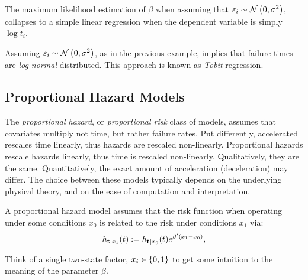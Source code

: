 \begin{example}
\label{eg:accelerated_gaussian}
The maximum likelihood estimation of $\beta$ when assuming that $\varepsilon_i \sim \mathcal{N}\left(0,\sigma^2\right)$, collapses to a simple linear regression when the dependent variable is simply $\log t_i$.
\end{example}


\begin{extra}
Assuming $\varepsilon_i \sim \mathcal{N}\left(0,\sigma^2\right)$, as in the previous example, implies that failure times are \emph{log normal} distributed. 
This approach is known as \emph{Tobit} regression.
\end{extra}







\subsection{Proportional Hazard Models}
The \emph{proportional hazard}, or \emph{proportional risk} class of models, assumes that covariates multiply not time, but rather failure rates. 
Put differently, accelerated rescales time linearly, thus hazards are rescaled non-linearly. Proportional hazards rescale hazards linearly, thus time is rescaled non-linearly. 
Qualitatively, they are the same. 
Quantitatively, the exact amount of acceleration (deceleration) may differ. 
The choice between these models typically depends on the underlying physical theory, and on the ease of computation and interpretation.


A proportional hazard model assumes that the risk function when operating under some conditions $x_0$ is related to the risk under conditions $x_1$ via:
\begin{align}
\label{eq:proportional_hazard}
	h_{\mathbf{t}|x_1} (t):=h_{\mathbf{t}|x_0} (t) e^{\beta'(x_1-x_0)}  ,
\end{align}


\begin{think}
	Think of a single two-state factor, $x_i \in\{ 0,1 \}$ to get some intuition to the meaning of the parameter $\beta$. 
\end{think}




